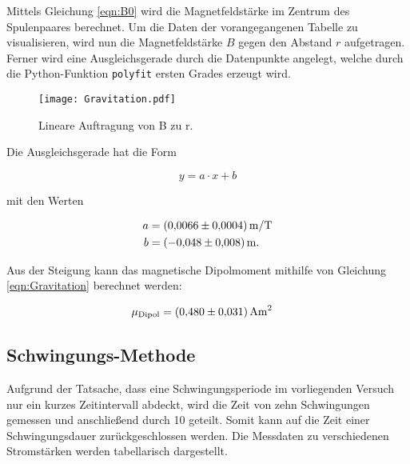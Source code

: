 \noindent Mittels Gleichung \eqref{eqn:B0} wird die Magnetfeldstärke im Zentrum des Spulenpaares berechnet. Um die Daten 
der vorangegangenen Tabelle zu visualisieren, wird nun die Magnetfeldstärke $B$ gegen den Abstand $r$ aufgetragen. Ferner
wird eine Ausgleichsgerade durch die Datenpunkte angelegt, welche durch die Python-Funktion \texttt{polyfit} ersten Grades
erzeugt wird.

\begin{figure}[H]
    \texttt{[image: Gravitation.pdf]}
    \caption{Lineare Auftragung von B zu r.}  
\end{figure}

\noindent Die Ausgleichsgerade hat die Form 

\begin{equation*}
    y = a\cdot x + b
\end{equation*}

\noindent mit den Werten

\begin{align*}
    a &= \qty{0.0066 \pm 0.0004}{\unit{\meter \per \tesla}} \\
    b &= \qty{-0.048 \pm 0.008}{\unit{\meter}}.
\end{align*}

\noindent Aus der Steigung kann das magnetische Dipolmoment mithilfe von Gleichung \eqref{eqn:Gravitation} 
berechnet werden:

\begin{align*}
    \mu_\text{Dipol} &= \qty{0.480 \pm 0.031}{\unit{\ampere \meter \squared}} 
\end{align*}


\subsection{Schwingungs-Methode}

Aufgrund der Tatsache, dass eine Schwingungsperiode im vorliegenden Versuch nur ein kurzes Zeitintervall abdeckt, 
wird die Zeit von zehn Schwingungen gemessen und anschließend durch 10 geteilt. 
Somit kann auf die Zeit einer Schwingungsdauer zurückgeschlossen werden. Die Messdaten zu verschiedenen Stromstärken 
werden tabellarisch dargestellt. 

